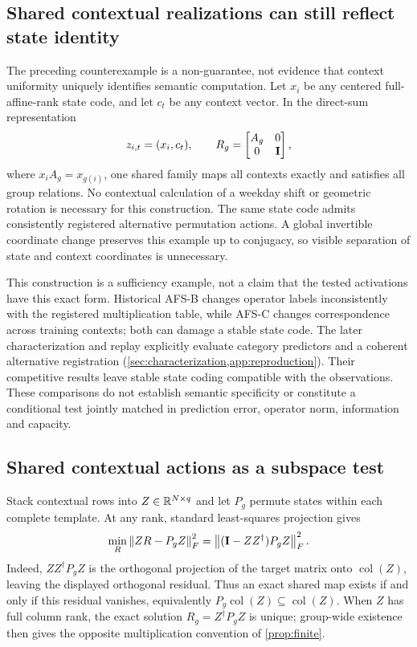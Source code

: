 \subsection{Shared contextual realizations can still reflect state identity}
The preceding counterexample is a non-guarantee, not evidence that context uniformity uniquely identifies semantic computation. Let $x_i$ be any centered full-affine-rank state code, and let $c_t$ be any context vector. In the direct-sum representation
\[
 z_{i,t}=(x_i,c_t),\qquad
 R_g=\begin{bmatrix}A_g&0\\0&\mathbf{I}\end{bmatrix},
\]
where $x_iA_g=x_{g(i)}$, one shared family maps all contexts exactly and satisfies all group relations. No contextual calculation of a weekday shift or geometric rotation is necessary for this construction. The same state code admits consistently registered alternative permutation actions. A global invertible coordinate change preserves this example up to conjugacy, so visible separation of state and context coordinates is unnecessary.

This construction is a sufficiency example, not a claim that the tested activations have this exact form. Historical AFS-B changes operator labels inconsistently with the registered multiplication table, while AFS-C changes correspondence across training contexts; both can damage a stable state code. The later characterization and replay explicitly evaluate category predictors and a coherent alternative registration (\cref{sec:characterization,app:reproduction}). Their competitive results leave stable state coding compatible with the observations. These comparisons do not establish semantic specificity or constitute a conditional test jointly matched in prediction error, operator norm, information and capacity.

\subsection{Shared contextual actions as a subspace test}
\label{app:contextual-realization}
Stack contextual rows into $Z\in\mathbb{R}^{N\times q}$ and let $P_g$ permute states within each complete template. At any rank, standard least-squares projection gives
\[
 \min_R\left\lVert ZR-P_gZ\right\rVert_F^2
 =\left\lVert (\mathbf{I}-ZZ^\dagger)P_gZ\right\rVert_F^2.
\]
Indeed, $ZZ^\dagger P_gZ$ is the orthogonal projection of the target matrix onto $\operatorname{col}(Z)$, leaving the displayed orthogonal residual. Thus an exact shared map exists if and only if this residual vanishes, equivalently $P_g\operatorname{col}(Z)\subseteq\operatorname{col}(Z)$. When $Z$ has full column rank, the exact solution $R_g=Z^\dagger P_gZ$ is unique; group-wide existence then gives the opposite multiplication convention of \cref{prop:finite}.

